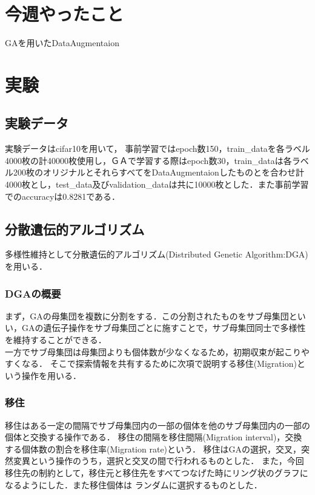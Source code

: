 \documentclass[twocolumn]{jarticle}     %
\begin{document}


\section{今週やったこと}
 GAを用いたDataAugmentaion

\section{実験}

\subsection{実験データ}
実験データはcifar10を用いて，
事前学習ではepoch数150，train\_dataを各ラベル4000枚の計40000枚使用し，ＧＡで学習する際はepoch数30，train\_dataは各ラベル200枚のオリジナルとそれらすべてをDataAugmentaionしたものとを合わせ計4000枚とし，test\_data及びvalidation\_dataは共に10000枚とした．また事前学習でのaccuracyは0.8281である．
\subsection{分散遺伝的アルゴリズム}
多様性維持として分散遺伝的アルゴリズム(Distributed Genetic Algorithm:DGA)\cite{廣安知之2002実験計画法を用いた分散遺伝的アルゴリズムのパラメータ推定}を用いる．

\subsubsection{DGAの概要}
まず，GAの母集団を複数に分割をする．この分割されたものをサブ母集団といい，GAの遺伝子操作をサブ母集団ごとに施すことで，サブ母集団同士で多様性を維持することができる．\\
一方でサブ母集団は母集団よりも個体数が少なくなるため，初期収束が起こりやすくなる．
そこで探索情報を共有するために次項で説明する移住(Migration)という操作を用いる．


\subsubsection{移住}
移住はある一定の間隔でサブ母集団内の一部の個体を他のサブ母集団内の一部の個体と交換する操作である．
移住の間隔を移住間隔(Migration interval)，交換する個体数の割合を移住率(Migration rate)という．
移住はGAの選択，交叉，突然変異という操作のうち，選択と交叉の間で行われるものとした．
また，今回移住先の制約として，移住元と移住先をすべてつなげた時にリング状のグラフになるようにした．また移住個体は
ランダムに選択するものとした．\\
\end{document}
